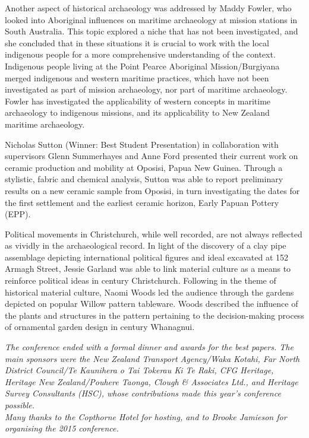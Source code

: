 Another aspect of historical archaeology was addressed by Maddy Fowler, who looked into Aboriginal influences on maritime archaeology at mission stations in South Australia. This topic explored a niche that has not been investigated, and she concluded that in these situations it is crucial to work with the local indigenous people for a more comprehensive understanding of the context. Indigenous people living at the Point Pearce Aboriginal Mission/Burgiyana merged indigenous and western maritime practices, which have not been investigated as part of mission archaeology, nor part of maritime archaeology. Fowler has investigated the applicability of western concepts in maritime archaeology to indigenous missions, and its applicability to New Zealand maritime archaeology.


Nicholas Sutton (Winner: Best Student Presentation) in collaboration with supervisors Glenn Summerhayes and Anne Ford presented their current work on ceramic production and mobility at Oposisi, Papua New Guinea. Through a stylistic, fabric and chemical analysis, Sutton was able to report preliminary results on a new ceramic sample from Oposisi, in turn investigating the dates for the first settlement and the earliest ceramic horizon, Early Papuan Pottery (EPP).  

Political movements in Christchurch, while well recorded, are not always reflected as vividly in the archaeological record. In light of the discovery of a clay pipe assemblage depicting international political figures and ideal excavated at 152 Armagh Street, Jessie Garland was able to link material culture as a means to reinforce political ideas in  century Christchurch. Following in the theme of historical material culture, Naomi Woods led the audience through the gardens depicted on popular Willow pattern tableware. Woods described the influence of the plants and structures in the pattern pertaining to the decision-making process of ornamental garden design in  century Whanagnui. 

\begin{aquote}
\emph{The conference ended with a formal dinner and awards for the best papers. The main sponsors were the New Zealand Transport Agency/Waka Kotahi, Far North District Council/Te Kaunihera o Tai Tokerau Ki Te Raki, CFG Heritage, Heritage New Zealand/Pouhere Taonga, Clough \& Associates Ltd., and Heritage Survey Consultants (HSC), whose contributions made this year’s conference possible. 
\\\newline Many thanks to the Copthorne Hotel for hosting, and to Brooke Jamieson for organising the 2015 conference.}
\end{aquote}


\label{NZAA:lastpage}
\closingarticle